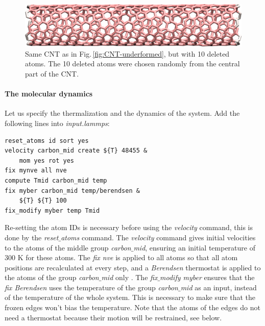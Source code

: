 \documentclass[9pt,tutorial]{livecoms}
\begin{document}
\begin{figure}
\centering
\includegraphics[width=\linewidth]{CNT-underformed-deleted}
\caption{Same CNT as in Fig.\,\ref{fig:CNT-underformed}, but with 10 deleted atoms. The 10 deleted atoms were chosen randomly from the central part of the CNT.}
\label{fig:CNT-underformed-deleted}
\end{figure}

\paragraph{The molecular dynamics}
Let us specify the thermalization and the dynamics of the system. Add the following lines into \textit{input.lammps}:
{\normalsize \begin{verbatim}
reset_atoms id sort yes
velocity carbon_mid create ${T} 48455 &
    mom yes rot yes
fix mynve all nve
compute Tmid carbon_mid temp
fix myber carbon_mid temp/berendsen &
    ${T} ${T} 100
fix_modify myber temp Tmid
\end{verbatim}}
Re-setting the atom IDs is necessary before using the \textit{velocity} command, this is done by the \textit{reset$\_$atoms} command. The \textit{velocity} command gives initial velocities to the atoms of the middle group \textit{carbon$\_$mid}, ensuring an initial temperature of 300 K for these atoms. The \textit{fix nve} is applied to all atoms so that all atom positions are recalculated at every step, and a \textit{Berendsen} thermostat is applied to the atoms of the group \textit{carbon$\_$mid} only \cite{berendsen1984molecular}. The \textit{fix$\_$modify myber} ensures that the \textit{fix Berendsen} uses the temperature of the group \textit{carbon$\_$mid} as an input, instead of the temperature of the whole system. This is necessary to make sure that the frozen edges won't bias the temperature. Note that the atoms of the edges do not need a thermostat because their motion will be restrained, see below.
\end{document}
